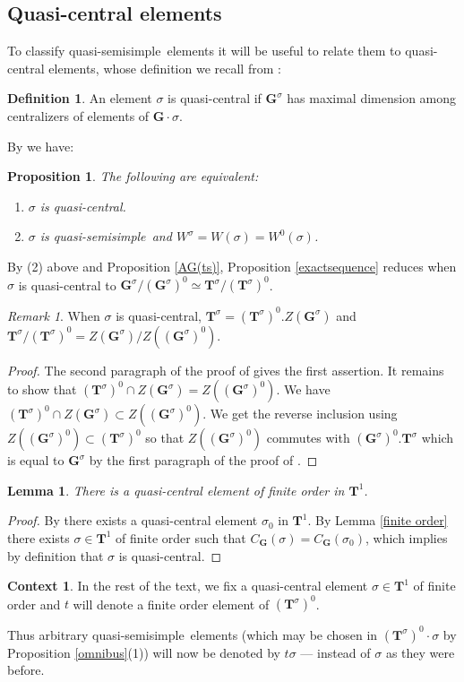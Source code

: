 \documentclass{amsart}
\newtheorem{lemma}[equation]{Lemma}
\newtheorem{proposition}[equation]{Proposition}
\numberwithin{equation}{section}
\theoremstyle{definition}
\newtheorem{definition}[equation]{Definition}
\newtheorem{context}[equation]{Context}
\theoremstyle{remark}
\newtheorem{remark}[equation]{Remark}
\newcommand\bG{{\mathbf G}}
\newcommand\bT{{\mathbf T}}
\newcommand\Tun{{\bT^1}}
\newcommand\Gs{{\bG^\sigma}}
\newcommand\Gso{{(\Gs)^0}}
\newcommand\Tso{{(\bT^\sigma)^0}}
\newcommand\Ts{{\bT^\sigma}}
\newcommand\qss{quasi-semisimple}
\begin{document}
\subsection*{Quasi-central elements}
To classify \qss\ elements it will be useful to relate them to quasi-central
elements, whose definition we recall from \cite[1.15]{grnc}:
\begin{definition}\label{quasicentral}
An element $\sigma$ is quasi-central if $\Gs$ has maximal dimension among
centralizers of elements of $\bG\cdot\sigma$.
\end{definition}
By \cite[1.15(iii)]{grnc} we have:
\begin{proposition}\label{Wsigma=Wosigma}The following are equivalent:
\begin{enumerate}
\item $\sigma$ is quasi-central.
\item $\sigma$ is \qss\ and $W^\sigma=W(\sigma)=W^0(\sigma)$.
\end{enumerate}
\end{proposition}
By (2) above and Proposition \ref{AG(ts)}, Proposition \ref{exactsequence}
reduces when $\sigma$ is quasi-central to $\Gs/\Gso\simeq\Ts/\Tso$.
\begin{remark} When $\sigma$ is quasi-central,
$\Ts=\Tso.Z(\bG^\sigma)$ and
$\Ts/\Tso= Z(\bG^\sigma)/Z(\Gso)$.
\end{remark}
\begin{proof}The second paragraph of the proof of \cite[1.29]{grnc}
gives the first assertion. It remains to show that
$\Tso\cap Z(\bG^\sigma)=Z(\Gso)$.
We have $\Tso\cap Z(\bG^\sigma)\subset Z(\Gso)$. We get the reverse
inclusion using $Z(\Gso)\subset \Tso$ so that
$Z(\Gso)$ commutes with 
$\Gso.\Ts$  which is equal to $\bG^\sigma$ by the 
first paragraph of the proof of \cite[1.29]{grnc}.
\end{proof}

\begin{lemma} There is a quasi-central element of finite order
in $\bT^1$.
\end{lemma}
\begin{proof}
By \cite[1.16]{grnc} there exists a quasi-central element $\sigma_0$
in $\Tun$. By Lemma \ref{finite order} there exists $\sigma\in\Tun$ of finite order
such that $C_\bG(\sigma)=C_\bG(\sigma_0)$, which implies by
definition that $\sigma$ is quasi-central.
\end{proof}
\begin{context}\label{fix qss}
In the rest of the text, we fix a quasi-central element $\sigma\in\Tun$
of finite order and $t$ will denote a finite order element of $\Tso$.
\end{context}
Thus   arbitrary  \qss\   elements  (which   may  be  chosen  in
$\Tso\cdot\sigma$  by Proposition \ref{omnibus}(1))  will now  be denoted  by 
$t\sigma$ --- instead of $\sigma$ as they were before.
\end{document}
